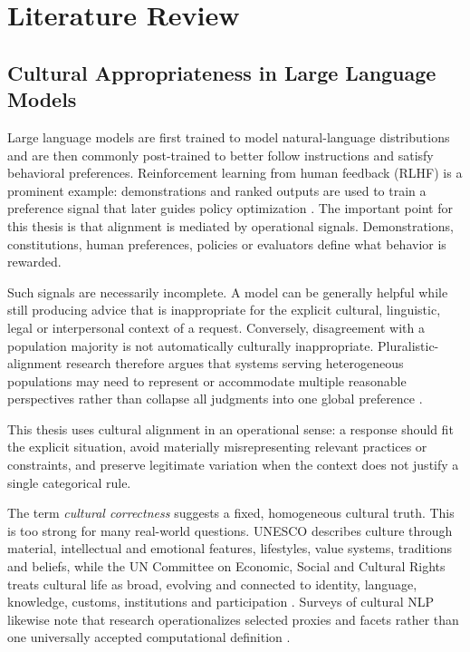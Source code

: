 \chapter{Literature Review}
\label{ch:literature-review}

\section{Cultural Appropriateness in Large Language Models}
Large language models are first trained to model natural-language distributions and are then commonly post-trained to better follow instructions and satisfy behavioral preferences. Reinforcement learning from human feedback (RLHF) is a prominent example: demonstrations and ranked outputs are used to train a preference signal that later guides policy optimization \parencite{ouyang2022instructgpt}. The important point for this thesis is that alignment is mediated by operational signals. Demonstrations, constitutions, human preferences, policies or evaluators define what behavior is rewarded.

Such signals are necessarily incomplete. A model can be generally helpful while still producing advice that is inappropriate for the explicit cultural, linguistic, legal or interpersonal context of a request. Conversely, disagreement with a population majority is not automatically culturally inappropriate. Pluralistic-alignment research therefore argues that systems serving heterogeneous populations may need to represent or accommodate multiple reasonable perspectives rather than collapse all judgments into one global preference \parencite{sorensen2024pluralistic}.

This thesis uses cultural alignment in an operational sense: a response should fit the explicit situation, avoid materially misrepresenting relevant practices or constraints, and preserve legitimate variation when the context does not justify a single categorical rule.

\label{sec:cultural-appropriateness}

The term \emph{cultural correctness} suggests a fixed, homogeneous cultural truth. This is too strong for many real-world questions. UNESCO describes culture through material, intellectual and emotional features, lifestyles, value systems, traditions and beliefs, while the UN Committee on Economic, Social and Cultural Rights treats cultural life as broad, evolving and connected to identity, language, knowledge, customs, institutions and participation \parencite{unesco2001culturaldiversity,cescr2009gc21}. Surveys of cultural NLP likewise note that research operationalizes selected proxies and facets rather than one universally accepted computational definition \parencite{adilazuarda2024culture,liu2025culturallyaware,pawar2025culturalawareness}.

